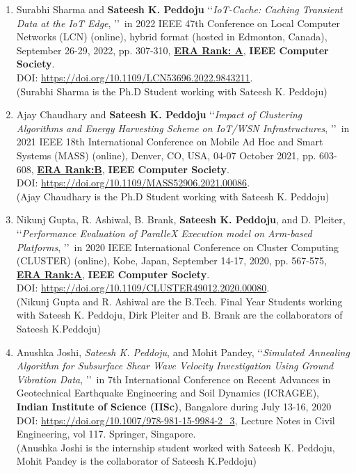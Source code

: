 \begin{enumerate}%

    \item
    Surabhi Sharma and \textbf{Sateesh K. Peddoju} \lq\lq \textit{IoT-Cache: Caching Transient Data at the IoT Edge}, \rq\rq\, in 2022 IEEE 47th Conference on Local Computer Networks (LCN) (online), hybrid format (hosted in Edmonton, Canada), September 26-29, 2022, pp. 307-310, \underline{\textbf{ERA Rank: A}}, \textbf{IEEE Computer Society}. \\DOI: \url{https://doi.org/10.1109/LCN53696.2022.9843211}.
   \\(Surabhi Sharma is the Ph.D Student working with Sateesh K. Peddoju)

       \item
    Ajay Chaudhary and \textbf{Sateesh K. Peddoju} \lq\lq \textit{Impact of Clustering Algorithms and Energy Harvesting Scheme on IoT/WSN Infrastructures}, \rq\rq\, in 2021 IEEE 18th International Conference on Mobile Ad Hoc and Smart Systems (MASS) (online), Denver, CO, USA, 04-07 October 2021, pp. 603-608, \underline{\textbf{ERA Rank:B}}, \textbf{IEEE Computer Society}. \\DOI: \url{https://doi.org/10.1109/MASS52906.2021.00086}.
   \\(Ajay Chaudhary is the Ph.D Student working with Sateesh K. Peddoju)
    
    \item
    Nikunj Gupta, R. Ashiwal, B. Brank, \textbf{Sateesh K. Peddoju}, and D. Pleiter, \lq\lq \textit{Performance Evaluation of ParalleX Execution model on Arm-based Platforms}, \rq\rq\, in 2020 IEEE International Conference on Cluster Computing (CLUSTER) (online), Kobe, Japan, September 14-17, 2020, pp. 567-575, \underline{\textbf{ERA Rank:A}}, \textbf{IEEE Computer Society}. \\DOI: \url{https://doi.org/10.1109/CLUSTER49012.2020.00080}.
   \\(Nikunj Gupta and R. Ashiwal are the B.Tech. Final Year Students working with Sateesh K. Peddoju, Dirk Pleiter and B. Brank are the collaborators of Sateesh K.Peddoju)


       \item
    Anushka Joshi, \textit{Sateesh K. Peddoju}, and Mohit Pandey, \lq\lq \textit{Simulated Annealing Algorithm for Subsurface Shear Wave Velocity Investigation Using Ground Vibration Data}, \rq\rq\, in 7th International Conference on Recent Advances in Geotechnical Earthquake Engineering and Soil Dynamics (ICRAGEE), \textbf{Indian Institute of Science (IISc)}, Bangalore during July 13-16, 2020 \\DOI: \url{https://doi.org/10.1007/978-981-15-9984-2_3},  Lecture Notes in Civil Engineering, vol 117. Springer, Singapore. 
   \\(Anushka Joshi is the internship student worked with Sateesh K. Peddoju, Mohit Pandey is the collaborator of Sateesh K.Peddoju)
    

\end{enumerate}
